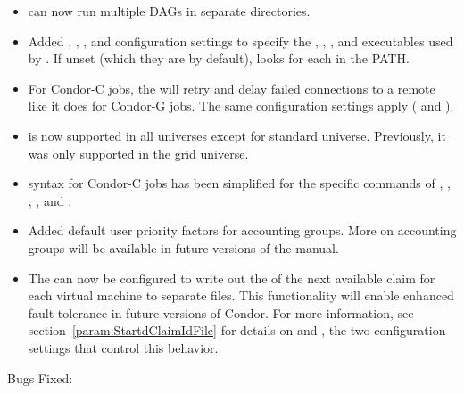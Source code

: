 \begin{itemize}

\item {} can now run multiple DAGs in separate directories.


\item Added ,
, ,
and  configuration settings to specify
the , , , and 
executables used by .  If unset (which they are by
default),  looks for each in the PATH.

\item For Condor-C jobs, the  will retry and delay
  failed connections to a remote  like it does for
  Condor-G jobs. The same configuration settings apply 
  ( and
  ).

\item {} is now supported in all universes except
for standard universe.  Previously, it was only supported in the grid universe.

\item {} syntax for Condor-C jobs has been
simplified for the specific commands of
, , , , and .

\item Added default user priority factors for accounting groups.  More on
        accounting groups will be available in future versions of the manual.

\item The  can now be configured to write out the
   of the next available claim for each virtual machine
  to separate files.
  This functionality will enable enhanced fault tolerance in future
  versions of Condor.
  For more information, see section~\ref{param:StartdClaimIdFile} for
  details on  and
  , the two configuration settings that
  control this behavior.

\end{itemize}

\noindent Bugs Fixed:

